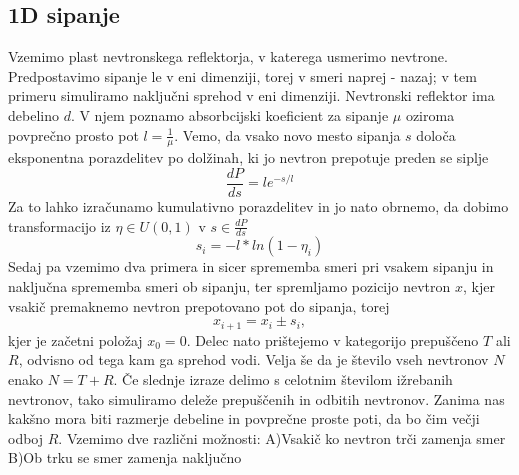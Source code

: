 \documentclass[11pt, a4paper]{article}
\begin{document}
\subsection{1D sipanje}
Vzemimo plast nevtronskega reflektorja, v katerega usmerimo nevtrone. Predpostavimo sipanje le v eni dimenziji, torej v smeri naprej - nazaj; v tem primeru simuliramo naključni sprehod v eni dimenziji. Nevtronski reflektor ima debelino $d$. V njem poznamo absorbcijski koeficient za sipanje $\mu$ oziroma povprečno prosto pot $l = \frac{1}{\mu}$. Vemo, da vsako novo mesto sipanja $s$ določa eksponentna porazdelitev po dolžinah, ki jo nevtron prepotuje preden se siplje
\begin{equation}
\frac{dP}{ds} = l e^{-s/l}
\end{equation}
Za to lahko izračunamo kumulativno porazdelitev in jo nato obrnemo, da dobimo transformacijo iz $\eta \in U(0,1)$ v $s \in  \frac{dP}{ds}$
\begin{equation}
s_i = - l * ln(1 - \eta_i)
\end{equation}
Sedaj pa vzemimo dva primera in sicer sprememba smeri pri vsakem sipanju in naključna sprememba smeri ob sipanju, ter spremljamo pozicijo nevtron  $x$, kjer vsakič premaknemo nevtron prepotovano pot do sipanja, torej
\begin{equation}
x_{i+1} = x_i \pm s_i ,
\end{equation} 
kjer je začetni položaj $ x_0 = 0$. Delec nato prištejemo v kategorijo prepuščeno $T$ ali $R$, odvisno od tega kam ga sprehod vodi. Velja še da je število vseh nevtronov $N$ enako $N = T + R$. Če slednje izraze delimo s celotnim številom ižrebanih nevtronov, tako simuliramo deleže prepuščenih in odbitih nevtronov. Zanima nas kakšno mora biti razmerje debeline in povprečne proste poti, da bo čim večji odboj $R$. \newline\newline
Vzemimo dve različni možnosti:\newline
A)Vsakič ko nevtron trči zamenja smer\newline
B)Ob trku se smer zamenja naključno 
\end{document}

